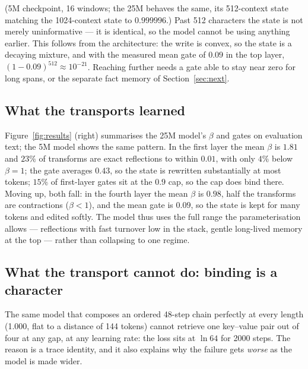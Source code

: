 \documentclass[10pt]{article}
\begin{document}
(5M checkpoint, 16 windows; the 25M behaves the same, its 512-context state matching the 1024-context
state to $0.999996$.) Past 512 characters the state is not merely uninformative --- it is identical, so
the model cannot be using anything earlier. This follows from the architecture: the write is convex, so
the state is a decaying mixture, and with the measured mean gate of $0.09$ in the top layer,
$(1-0.09)^{512}\approx10^{-21}$. Reaching further needs a gate able to stay near zero for long spans, or
the separate fact memory of Section~\ref{sec:next}.

\subsection{What the transports learned}

Figure~\ref{fig:results} (right) summarises the 25M model's $\beta$ and gates on evaluation text; the
5M model shows the same pattern. In the first layer the mean $\beta$ is $1.81$ and $23\%$ of transforms
are exact reflections to within $0.01$, with only $4\%$ below $\beta=1$; the gate averages $0.43$, so the
state is rewritten substantially at most tokens; $15\%$ of first-layer gates sit at the $0.9$ cap, so the
cap does bind there. Moving up, both fall: in the fourth layer the mean
$\beta$ is $0.98$, half the transforms are contractions ($\beta<1$), and the mean gate is $0.09$, so the state
is kept for many tokens and edited softly. The model thus uses the full range the parameterisation allows
--- reflections with fast turnover low in the stack, gentle long-lived memory at the top --- rather than
collapsing to one regime.

\subsection{What the transport cannot do: binding is a character}
\label{sec:binding}

The same model that composes an ordered 48-step chain perfectly at every length (1.000, flat to a
distance of 144 tokens) cannot retrieve one key--value pair out of four at any gap, at any learning
rate: the loss sits at $\ln 64$ for 2000 steps. The reason is a trace identity, and it also explains
why the failure gets \emph{worse} as the model is made wider.
\end{document}
